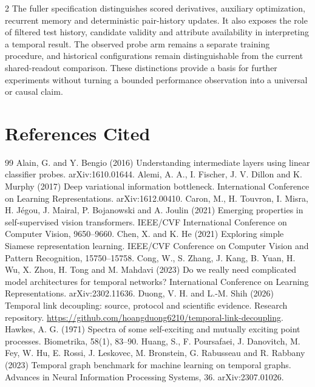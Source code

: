 \documentclass[a4paper,10pt]{article}
\begin{document}
\begin{multicols}{2}
The fuller specification distinguishes scored derivatives, auxiliary optimization, recurrent memory and deterministic pair-history updates. It also exposes the role of filtered test history, candidate validity and attribute availability in interpreting a temporal result. The observed probe arm remains a separate training procedure, and historical configurations remain distinguishable from the current shared-readout comparison. These distinctions provide a basis for further experiments without turning a bounded performance observation into a universal or causal claim.

\section*{References Cited}
\begingroup
\renewcommand{\section}[2]{}
\begin{thebibliography}{99}
 Alain, G. and Y. Bengio (2016) Understanding intermediate layers using linear classifier probes. arXiv:1610.01644.
 Alemi, A. A., I. Fischer, J. V. Dillon and K. Murphy (2017) Deep variational information bottleneck. International Conference on Learning Representations. arXiv:1612.00410.
 Caron, M., H. Touvron, I. Misra, H. J\'egou, J. Mairal, P. Bojanowski and A. Joulin (2021) Emerging properties in self-supervised vision transformers. IEEE/CVF International Conference on Computer Vision, 9650--9660.
 Chen, X. and K. He (2021) Exploring simple Siamese representation learning. IEEE/CVF Conference on Computer Vision and Pattern Recognition, 15750--15758.
 Cong, W., S. Zhang, J. Kang, B. Yuan, H. Wu, X. Zhou, H. Tong and M. Mahdavi (2023) Do we really need complicated model architectures for temporal networks? International Conference on Learning Representations. arXiv:2302.11636.
 Duong, V. H. and L.-M. Shih (2026) Temporal link decoupling: source, protocol and scientific evidence. Research repository. \url{https://github.com/hoangduong6210/temporal-link-decoupling}.
 Hawkes, A. G. (1971) Spectra of some self-exciting and mutually exciting point processes. Biometrika, 58(1), 83--90.
 Huang, S., F. Poursafaei, J. Danovitch, M. Fey, W. Hu, E. Rossi, J. Leskovec, M. Bronstein, G. Rabusseau and R. Rabbany (2023) Temporal graph benchmark for machine learning on temporal graphs. Advances in Neural Information Processing Systems, 36. arXiv:2307.01026.

\end{thebibliography}
\end{multicols}
\end{document}
